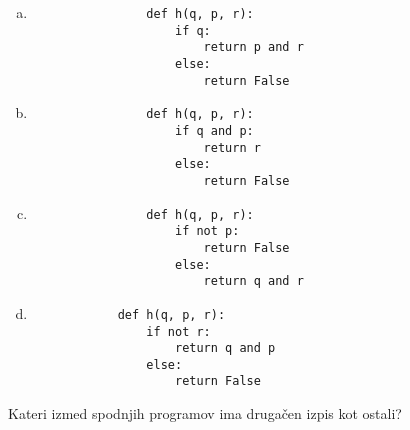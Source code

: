 \documentclass[arhiv, 10pt]{../izpit}
\begin{document}
        \begin{multicols}{2}
        \begin{enumerate}[(a)]
\item 
                \begin{verbatim}
                def h(q, p, r):
                    if q:
                        return p and r
                    else:
                        return False
                \end{verbatim}
            
\item 
                \begin{verbatim}
                def h(q, p, r):
                    if q and p:
                        return r
                    else:
                        return False
                \end{verbatim}
            
\item 
                \begin{verbatim}
                def h(q, p, r):
                    if not p:
                        return False
                    else:
                        return q and r
                \end{verbatim}
            
\item 
            \begin{verbatim}
            def h(q, p, r):
                if not r:
                    return q and p
                else:
                    return False
            \end{verbatim}
        
\end{enumerate}

        \end{multicols}
    
        \naloga*
        
        Kateri izmed spodnjih programov ima drugačen izpis kot ostali?
    
\end{document}
